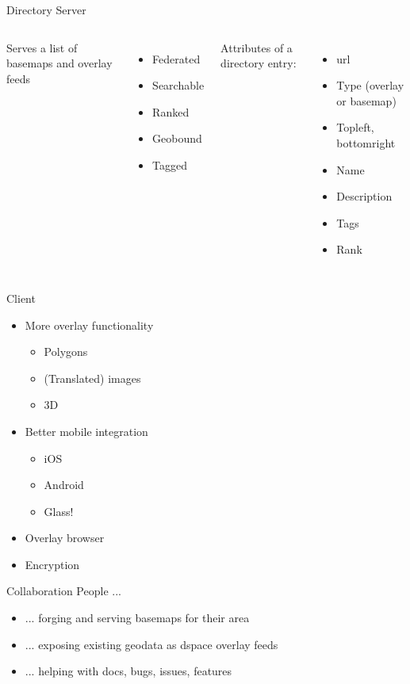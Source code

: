 \documentclass{beamer}
\begin{document}
\begin{frame}{Directory Server}
 \vspace{0.8em}
 \begin{columns}
   Serves a list of basemaps and overlay feeds
    \begin{itemize}
    \item Federated
    \item Searchable
    \item Ranked
    \item Geobound
    \item Tagged
    \end{itemize}
   Attributes of a directory entry:
    \begin{itemize}
    \item url
    \item Type (overlay or basemap)
    \item Topleft, bottomright
    \item Name
    \item Description
    \item Tags
    \item Rank
    \end{itemize}
 \end{columns}
\end{frame}

\begin{frame}{Client}
\begin{itemize}
\item More overlay functionality
    \begin{itemize}
    \item Polygons
    \item (Translated) images
    \item 3D
    \end{itemize}
\item Better mobile integration
    \begin{itemize}
    \item iOS
    \item Android
    \item Glass!
    \end{itemize}
\item Overlay browser
\item Encryption
\end{itemize}
\end{frame}

\begin{frame}{Collaboration}
People ...
\begin{itemize}
\item ... forging and serving basemaps for their area
\item ... exposing existing geodata as dspace overlay feeds
\item ... helping with docs, bugs, issues, features
\end{itemize}
\end{frame}
\end{document}
